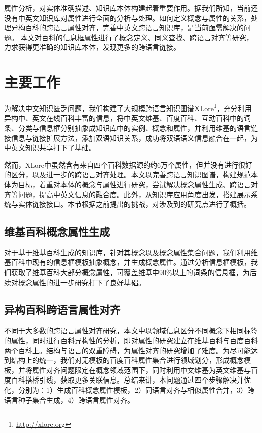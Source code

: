 属性分析，对实体准确描述、知识库本体构建起着重要作用。据我们所知，当前还没有中英文知识库对属性进行全面的分析与处理。如何定义概念与属性的关系，处理异构百科的跨语言属性对齐，完善中英文跨语言知识库，是当前亟需解决的问题。
本文对百科的信息框属性进行了概念定义、同义查找、跨语言对齐等研究，力求获得更准确的知识库本体，发现更多的跨语言链接。

\section{主要工作}
为解决中文知识匮乏问题，我们构建了大规模跨语言知识图谱XLore\footnote{\url{http://xlore.org}}，充分利用异构中、英文在线百科丰富的信息，将中英文维基、百度百科、互动百科中的词条、分类与信息框分别抽象成知识库中的实例、概念和属性，并利用维基的语言链接信息与链接扩展方法\cite{wang2012cross}，添加双语知识关系，成功将双语语义信息融合在一起，为中英文知识共享打下了基础。

然而，XLore中虽然含有来自四个百科数据源的约6万个属性，但并没有进行很好的区分，以及进一步的跨语言对齐处理。本文以完善跨语言知识图谱，构建规范本体为目标，着重对本体的概念与属性进行研究，尝试解决概念属性生成、跨语言对齐等问题，提高中英文信息的融合度。此外，从知识库应用角度出发，搭建展示系统与实体链接接口。本节根据之前提出的挑战，对涉及到的研究点进行了概括。

\subsection{维基百科概念属性生成}
对于基于维基百科生成的知识库，针对其概念以及概念属性集合问题，我们利用维基百科中现有的信息框模板抽象概念，并生成概念属性。通过分析信息框模板，我们获取了维基百科大部分概念属性，可覆盖维基中90\%以上的词条的信息框，为后续对概念属性的进一步研究打下了良好基础。

\subsection{异构百科跨语言属性对齐}
不同于大多数的跨语言属性对齐研究，本文中以领域信息区分不同概念下相同标签的属性，同时进行百科异构性的分析，即对属性的研究建立在维基百科与百度百科两个百科上。结构与语言的双重障碍，为属性对齐的研究增加了难度。为尽可能达到结构上的统一，我们对无模板的百度百科属性集合进行领域划分，形成概念模板，并将属性对齐问题限定在概念领域范围下，同时利用中文维基为英文维基与百度百科搭桥引线，获取更多关联信息。总结来讲，本问题通过四个步骤解决并优化，分别为：1）生成百科概念属性模板，2）同语言对齐与相似属性合并，3）跨语言种子集合生成，4）跨语言属性对齐。

